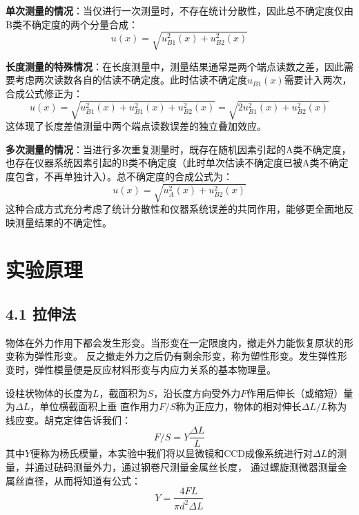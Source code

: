 \documentclass[11pt]{article}
\begin{document}
\textbf{单次测量的情况}：当仅进行一次测量时，不存在统计分散性，因此总不确定度仅由B类不确定度的两个分量合成：
\begin{equation}
    u(x)=\sqrt{u_{B1}^2(x)+u^2_{B2}(x)} 
\end{equation}

\textbf{长度测量的特殊情况}：在长度测量中，测量结果通常是两个端点读数之差，因此需要考虑两次读数各自的估读不确定度。此时估读不确定度$u_{B1}(x)$需要计入两次，合成公式修正为：
\begin{equation}
    u(x)=\sqrt{u_{B1}^2(x)+u_{B1}^2(x)+u^2_{B2}(x)} =\sqrt{2u_{B1}^2(x)+u^2_{B2}(x)} 
\end{equation}
这体现了长度差值测量中两个端点读数误差的独立叠加效应。

\textbf{多次测量的情况}：当进行多次重复测量时，既存在随机因素引起的A类不确定度，也存在仪器系统因素引起的B类不确定度（此时单次估读不确定度已被A类不确定度包含，不再单独计入）。总不确定度的合成公式为：
\begin{equation}
   u(x)=\sqrt{u_A^2(x)+u^2_{B2}(x)} 
\end{equation}
这种合成方式充分考虑了统计分散性和仪器系统误差的共同作用，能够更全面地反映测量结果的不确定性。




\section{实验原理}
\subsection*{4.1 拉伸法}
物体在外力作用下都会发生形变。当形变在一定限度内，撤走外力能恢复原状的形变称为弹性形变。
反之撤走外力之后仍有剩余形变，称为塑性形变。发生弹性形变时，弹性模量便是反应材料形变与内应力关系的基本物理量。

设柱状物体的长度为$L$，截面积为$S$，沿长度方向受外力$F$作用后伸长（或缩短）量为$\Delta L$，单位横截面积上垂
直作用力$F/S$称为正应力，物体的相对伸长$\Delta L/L$称为线应变。胡克定律告诉我们：
\begin{equation}
   F/S=Y\frac{\Delta L}{L} 
\end{equation}
其中$Y$便称为杨氏模量，本实验中我们将以显微镜和CCD成像系统进行对$\Delta L$的测量，并通过砝码测量外力，通过钢卷尺测量金属丝长度，
通过螺旋测微器测量金属丝直径，从而将知道有公式：
\begin{equation}
    Y=\frac{4FL}{\pi d^2\Delta L}
\end{equation}
\end{document}
